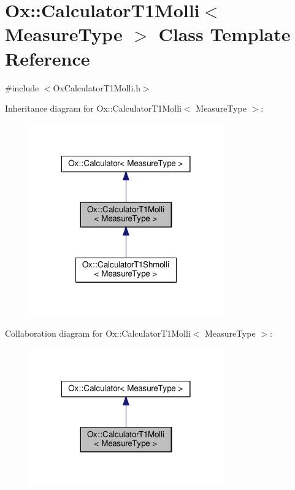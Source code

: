 \hypertarget{class_ox_1_1_calculator_t1_molli}{\section{Ox\-:\-:Calculator\-T1\-Molli$<$ Measure\-Type $>$ Class Template Reference}
\label{class_ox_1_1_calculator_t1_molli}
}


{\ttfamily \#include $<$Ox\-Calculator\-T1\-Molli.\-h$>$}



Inheritance diagram for Ox\-:\-:Calculator\-T1\-Molli$<$ Measure\-Type $>$\-:
\nopagebreak
\begin{figure}[H]
\begin{center}
\leavevmode
\includegraphics[width=236pt]{class_ox_1_1_calculator_t1_molli__inherit__graph}
\end{center}
\end{figure}


Collaboration diagram for Ox\-:\-:Calculator\-T1\-Molli$<$ Measure\-Type $>$\-:
\nopagebreak
\begin{figure}[H]
\begin{center}
\leavevmode
\includegraphics[width=236pt]{class_ox_1_1_calculator_t1_molli__coll__graph}
\end{center}
\end{figure}
